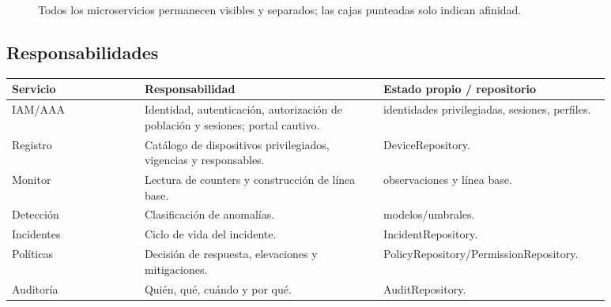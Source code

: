 \documentclass[11pt,a4paper]{article}
\begin{document}
\begin{figure}[H]
\centering
{}
\caption{Todos los microservicios permanecen visibles y separados; las cajas punteadas solo indican afinidad.}
\end{figure}

\subsection{Responsabilidades}

\begin{longtable}{p{0.2\linewidth}p{0.36\linewidth}p{0.32\linewidth}}
\toprule
Servicio & Responsabilidad & Estado propio / repositorio\\
\midrule
IAM/AAA & Identidad, autenticación, autorización de población y sesiones; portal cautivo. & identidades privilegiadas, sesiones, perfiles.\\
Registro & Catálogo de dispositivos privilegiados, vigencias y responsables. & DeviceRepository.\\
Monitor & Lectura de counters y construcción de línea base. & observaciones y línea base.\\
Detección & Clasificación de anomalías. & modelos/umbrales.\\
Incidentes & Ciclo de vida del incidente. & IncidentRepository.\\
Políticas & Decisión de respuesta, elevaciones y mitigaciones. & PolicyRepository/PermissionRepository.\\
Auditoría & Quién, qué, cuándo y por qué. & AuditRepository.\\
\bottomrule
\end{longtable}
\end{document}
